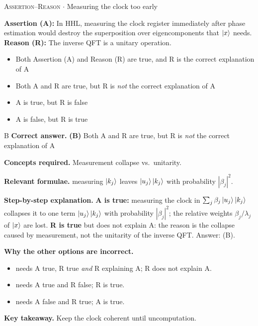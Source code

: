 \documentclass[11pt,a4paper]{article}
\newcommand{\optlabel}[1]{\textbf{(#1)}}
\newcommand{\correctlabel}[1]{\textcolor{okgreen}{\textbf{(#1)}\,\ding{51}}}
\newenvironment{qitem}[1]{\begin{list}{}{\setlength{\leftmargin}{3.3em}\setlength{\labelwidth}{3.1em}%
  \setlength{\labelsep}{0.2em}\setlength{\topsep}{3pt}\setlength{\parsep}{3pt}}\item[\textbf{Q.#1}\hfill]}{\end{list}}
\newcommand{\qsep}{\par\vspace{2pt}{\color{black!15}\hrule}\vspace{4pt}}
\newcommand{\qmeta}[2]{{\footnotesize\color{black!60}\textsc{#1} \;$\cdot$\; #2}\par}
\begin{document}
\begin{qitem}{35}
\qmeta{Assertion--Reason}{Measuring the clock too early}
\textbf{Assertion (A):} In HHL, measuring the clock register immediately after phase estimation would destroy the superposition over eigencomponents that $\ket x$ needs.\\[1mm]
\textbf{Reason (R):} The inverse QFT is a unitary operation.
\begin{itemize}[leftmargin=2.6em, labelsep=0.4em, itemsep=2pt, topsep=3pt]
\item[\optlabel{A}] Both Assertion (A) and Reason (R) are true, and R is the correct explanation of A
\item[\correctlabel{B}] Both A and R are true, but R is \emph{not} the correct explanation of A
\item[\optlabel{C}] A is true, but R is false
\item[\optlabel{D}] A is false, but R is true
\end{itemize}
\end{qitem}
\begin{solbox}{B}
\textbf{\color{brand}Correct answer.} \textcolor{okgreen}{\textbf{(B)}} Both A and R are true, but R is \emph{not} the correct explanation of A

\textbf{\color{brand}Concepts required.} Measurement collapse vs.\ unitarity.

\textbf{\color{brand}Relevant formulae.} measuring $\ket{k_j}$ leaves $\ket{u_j}\ket{k_j}$ with probability $|\beta_j|^2$.

\textbf{\color{brand}Step-by-step explanation.} \textbf{A is true:} measuring the clock in $\sum_j\beta_j\ket{u_j}\ket{k_j}$ collapses it to one term $\ket{u_j}\ket{k_j}$ with probability $|\beta_j|^2$; the relative weights $\beta_j/\lambda_j$ of $\ket x$ are lost.
\textbf{R is true} but does not explain A: the reason is the collapse caused by measurement, not the unitarity of the inverse QFT. Answer: (B).

\textbf{\color{brand}Why the other options are incorrect.}
\begin{itemize}[leftmargin=2.4em, itemsep=1pt, topsep=2pt]
\item[\textbf{(A)}] needs A true, R true \emph{and} R explaining A; R does not explain A.
\item[\textbf{(C)}] needs A true and R false; R is true.
\item[\textbf{(D)}] needs A false and R true; A is true.
\end{itemize}
\textbf{\color{brand}Key takeaway.} Keep the clock coherent until uncomputation.
\end{solbox}
\qsep
\end{document}
